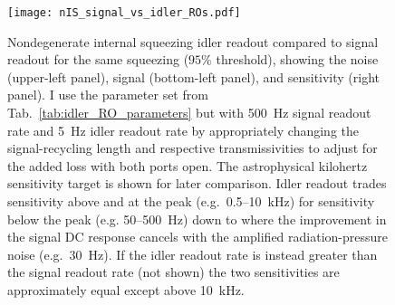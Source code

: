 \begin{figure}[t]
    \centering
    \texttt{[image: nIS\_signal\_vs\_idler\_ROs.pdf]}
    \caption{ Nondegenerate internal squeezing idler readout compared to signal readout for the same squeezing ($95\%$ threshold), showing the noise (upper-left panel), signal (bottom-left panel), and sensitivity (right panel). I use the parameter set from Tab.~\ref{tab:idler_RO_parameters} but with 500~Hz signal readout rate and 5~Hz idler readout rate by appropriately changing the signal-recycling length and respective transmissivities to adjust for the added loss with both ports open. The astrophysical kilohertz sensitivity target is shown for later comparison. Idler readout trades sensitivity above and at the peak (e.g.\ 0.5--10~kHz) for sensitivity below the peak (e.g. 50--500~Hz) down to where the improvement in the signal DC response cancels with the amplified radiation-pressure noise (e.g.\ 30~Hz). If the idler readout rate is instead greater than the signal readout rate (not shown) the two sensitivities are approximately equal except above 10~kHz. %
    }
    \label{fig:nIS_signal_vs_idler_ROs}
\end{figure}

